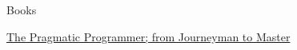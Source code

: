 \begin{cventries}
  \cventry
    {Books}
    {}
    {}
    {}
    {
      \begin{cvitems}
        \item {\href{https://www.goodreads.com/book/show/4099.The_Pragmatic_Programmer}{The Pragmatic Programmer; from Journeyman to Master}}
      \end{cvitems}
    }
\end{cventries}
